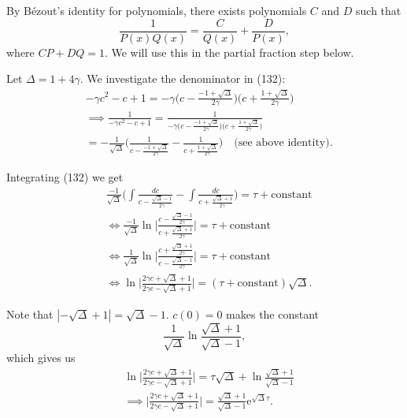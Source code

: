 \documentclass[12pt]{article}
\begin{document}
By B\'{e}zout's identity for polynomials, there exists polynomials $C$
and $D$ such that
\begin{equation}
\frac{1}{P(x) Q(x)} = \frac{C}{Q(x)} + \frac{D}{P(x)},
\end{equation}
where $CP+DQ = 1$. We will use this in the partial fraction step below.

Let $\Delta=1 + 4\gamma$. We investigate the denominator in (132):
\begin{align}
&-\gamma c^2 - c + 1 = - \gamma
                        \Big(c - \frac{-1 + \sqrt{\Delta}}{2 \gamma}\Big)
                        \Big(c + \frac{ 1 + \sqrt{\Delta}}{2 \gamma}\Big) \\
&\implies \frac{1}{- \gamma c^2 - c + 1} = \frac{1}
                        {- \gamma
                        \Big(c - \frac{-1 + \sqrt{\Delta}}{2 \gamma}\Big)
                        \Big(c + \frac{ 1 + \sqrt{\Delta}}{2 \gamma}\Big)} \\
&= - \frac{1}{\sqrt{\Delta}}
   \Bigg(\frac{1}{c - \frac{-1 + \sqrt{\Delta}}{2 \gamma}} -
        \frac{1}{c + \frac{1 + \sqrt{\Delta}}{2 \gamma}} \Bigg)
   \quad \text{(see above identity)}.
\end{align}

Integrating (132) we get
\begin{align}
&\frac{-1}{\sqrt{\Delta}}
\Big( \int \frac{dc}{c - \frac{\sqrt{\Delta} - 1}{2 \gamma}} -
      \int \frac{dc}{c + \frac{\sqrt{\Delta} + 1}{2 \gamma}}
\Big) = \tau + \text{constant} \\
&\iff \frac{-1}{\sqrt{\Delta}}
      \ln \bigg|\frac{c - \frac{\sqrt{\Delta}-1}{2\gamma}}
                     {c + \frac{\sqrt{\Delta}+1}{2\gamma}} \bigg|
 = \tau + \text{constant} \\
&\iff \frac{1}{\sqrt{\Delta}}
      \ln \bigg|\frac{c + \frac{\sqrt{\Delta}+1}{2\gamma}}
                     {c - \frac{\sqrt{\Delta}-1}{2\gamma}} \bigg|
 = \tau + \text{constant} \\
&\iff  \ln \bigg|\frac{2\gamma c + \sqrt{\Delta}+1}
                      {2\gamma c - \sqrt{\Delta}+1} \bigg|
 = (\tau + \text{constant}) \sqrt{\Delta}.
\end{align}

Note that $|-\sqrt{\Delta}+1| = \sqrt{\Delta} - 1$. $c(0)=0$ makes the constant
\begin{equation}
\frac{1}{\sqrt{\Delta}} \ln \frac{\sqrt{\Delta}+1}{{\sqrt{\Delta}-1}},
\end{equation}
which gives us
\begin{align}
&\ln \bigg|\frac{2\gamma c + \sqrt{\Delta}+1}
                {2\gamma c - \sqrt{\Delta}+1} \bigg|
 = \tau \sqrt{\Delta} + \ln \frac{\sqrt{\Delta}+1}{{\sqrt{\Delta}-1}}\\
&\implies \bigg|\frac{2\gamma c + \sqrt{\Delta}+1}
                     {2\gamma c - \sqrt{\Delta}+1} \bigg|
 = \frac{\sqrt{\Delta}+1}{{\sqrt{\Delta}-1}} \mathrm{e}^{\sqrt{\Delta} \tau}.
\end{align}
\end{document}
